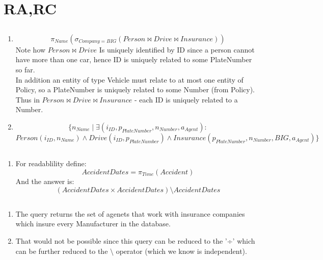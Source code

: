 \section{RA,RC}
\subsection{}
\begin{enumerate}
    \item \[
        \pi_{Name}(
            \sigma_{Company=BIG}(
                Person\Join Drive \Join Insurance
            )
        )
    \]
    Note how $Person\Join Drive$ Is uniquely identified
    by ID since a person cannot have more than one car,
    hence ID is uniquely related to some PlateNumber so far.\\

    In addition an entity of type Vehicle must relate
    to at most one entity of Policy,
    so a PlateNumber is uniquely related to some Number (from Policy).\\

    Thus in $Person\Join Drive\Join Insurance$ - each ID
    is uniquely related to a Number.
    
    \item $$\{n_{Name}\mid
        \exists \left(i_{ID}, p_{PlateNumber}, n_{Number}, a_{Agent}\right):
    $$$$
        Person(i_{ID}, n_{Name})\wedge
        Drive(i_{ID}, p_{PlateNumber})\wedge
        Insurance(p_{PlateNumber}, n_{Number}, BIG, a_{Agent})
    \}    
    $$
\end{enumerate}

\subsection{}
\subsection{}
\begin{enumerate}
    \item For readablility define:
    $$AccidentDates=\pi_{Time}(Accident)$$
    And the answer is:
    $$
        (AccidentDates\times AccidentDates)\setminus AccidentDates
    $$
\end{enumerate}

\subsection{}
\begin{enumerate}
    \item The query returns the set of agenets that work with insurance
    companies which insure every Manufacturer in the database.
    \item That would not be possible since this query
    can be reduced to the '÷' which can be further reduced
    to the $\setminus$ operator (which we know is independent).\\
\end{enumerate}

\subsection{}